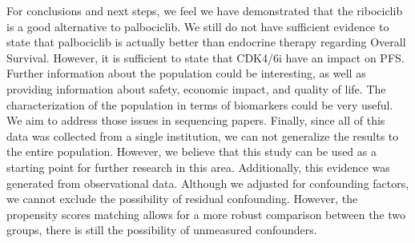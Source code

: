 For conclusions and next steps, we feel we have demonstrated that the ribociclib is a good alternative to palbociclib. We still do not have sufficient evidence to state that palbociclib is actually better than endocrine therapy regarding Overall Survival. However, it is sufficient to state that CDK4/6i have an impact on PFS.
Further information about the population could be interesting, as well as providing information about safety, economic impact, and quality of life. The characterization of the population in terms of biomarkers could be very useful. We aim to address those issues in sequencing papers. 
Finally, since all of this data was collected from a single institution, we can not generalize the results to the entire population. However, we believe that this study can be used as a starting point for further research in this area. Additionally, this evidence was generated from observational data. Although we adjusted for confounding factors, we cannot exclude the possibility of residual confounding. However, the propensity scores matching allows for a more robust comparison between the two groups, there is still the possibility of unmeasured confounders.